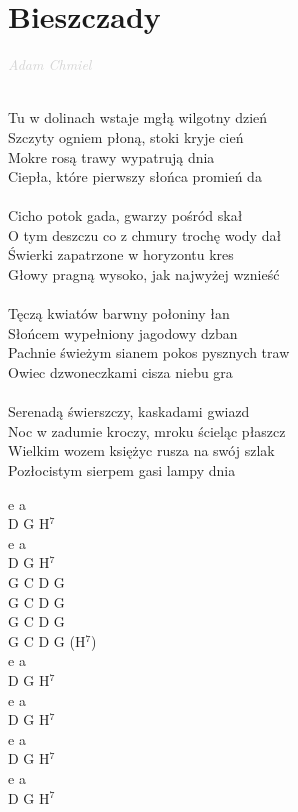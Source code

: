 \documentclass[a5paper, 10pt]{book}
\begin{document}
\section{Bieszczady}\textcolor{lightgray}{\textit{Adam Chmiel}}\\~\\
\begin{minipage}[t]{0.7\textwidth}
  Tu w dolinach wstaje mgłą wilgotny dzień\\
  Szczyty ogniem płoną, stoki kryje cień			\\
  Mokre rosą trawy wypatrują dnia\\
  Ciepła, które pierwszy słońca promień da\\
\\
  \hspace*{5mm}Cicho potok gada, gwarzy pośród skał			\\
\hspace*{5mm}O tym deszczu co z chmury trochę wody dał\\
\hspace*{5mm}Świerki zapatrzone w horyzontu kres\\
\hspace*{5mm}Głowy pragną wysoko, jak najwyżej wznieść\\
\\
Tęczą kwiatów barwny połoniny łan\\
Słońcem wypełniony jagodowy dzban\\
Pachnie świeżym sianem pokos pysznych traw\\
Owiec dzwoneczkami cisza niebu gra\\
\\
Serenadą świerszczy, kaskadami gwiazd\\
Noc w zadumie kroczy, mroku ścieląc płaszcz\\
Wielkim wozem księżyc rusza na swój szlak\\
Pozłocistym sierpem gasi lampy dnia\\

\end{minipage}
\begin{minipage}[t]{0.3\textwidth}
  e a\\
  D G H$^7$\\
  e a\\
  D G H$^7$\\

  G C D G\\
  G C D G\\
  G C D G\\
  G C D G (H$^7$)\\

  e a\\
  D G H$^7$\\
  e a\\
  D G H$^7$\\

  e a\\
  D G H$^7$\\
  e a\\
  D G H$^7$\\
\end{minipage}
\end{document}
